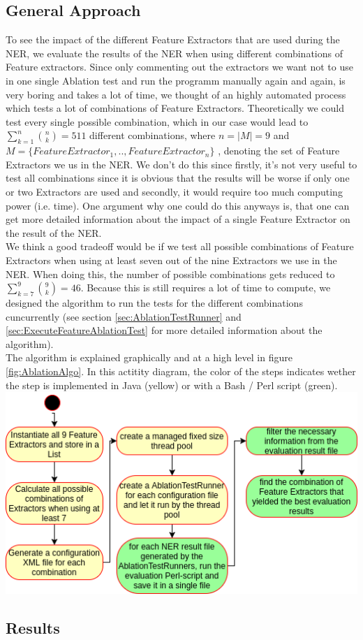 \documentclass[11pt, english]{article}
\begin{document}
\subsection{General Approach}
\label{sec:AblationApproach}
To see the impact of the different Feature Extractors that are used during the NER, we evaluate the results of the NER when using different combinations of Feature extractors. Since only commenting out the extractors we want not to use in one single Ablation test and run the programm manually again and again, is very boring and takes a lot of time, we thought of an highly automated process which tests a lot of combinations of Feature Extractors. Theoretically we could test every single possible combination, which in our case would lead to $\sum_{k=1}^{n}\binom{n}{k} = 511$ different combinations, where $n = \left | M \right | = 9$ and $M = \{ FeatureExtractor_1, ..,  FeatureExtractor_n \}$ , denoting the set of Feature Extractors we us in the NER. We don't do this since firstly, it's not very useful to test all combinations since it is obvious that the results will be worse if only one or two Extractors are used and secondly, it would require too much computing power (i.e. time). One argument why one could do this anyways is, that one can get more detailed information about the impact of a single Feature Extractor on the result of the NER.\\
We think a good tradeoff would be if we test all possible combinations of Feature Extractors when using at least seven out of the nine Extractors we use in the NER. When doing this, the number of possible combinations gets reduced to $\sum_{k=7}^{9}\binom{9}{k} = 46$. Because this is still requires a lot of time to compute, we designed the algorithm to run the tests for the different combinations cuncurrently (see section \ref{sec:AblationTestRunner} and \ref{sec:ExecuteFeatureAblationTest} for more detailed information about the algorithm).\\
The algorithm is explained graphically and at a high level in figure \ref{fig:AblationAlgo}. In this actitity diagram, the color of the steps indicates wether the step is implemented in Java (yellow) or with a Bash / Perl script (green).\\

\includegraphics[scale=0.75]{gfx/ablationAlgo.png}
\label{fig:AblationAlgo}


\subsection{Results}
\end{document}
